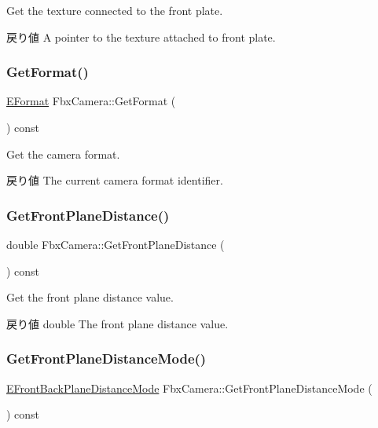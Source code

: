 Get the texture connected to the front plate. \begin{DoxyReturn}{戻り値}
A pointer to the texture attached to front plate. 
\end{DoxyReturn}
\mbox{\label{class_fbx_camera_a068be46bd59bcaa398565fcff992d18f}} 
\subsubsection{\texorpdfstring{Get\+Format()}{GetFormat()}}
{\footnotesize\ttfamily \hyperlink{class_fbx_camera_a88d68c983d21e4d6c0f281a8a30f0a06}{E\+Format} Fbx\+Camera\+::\+Get\+Format (\begin{DoxyParamCaption}{ }\end{DoxyParamCaption}) const}

Get the camera format. \begin{DoxyReturn}{戻り値}
The current camera format identifier. 
\end{DoxyReturn}
\mbox{\label{class_fbx_camera_a3097c7c0e8a3ce8e809c248d9d8be18b}} 
\subsubsection{\texorpdfstring{Get\+Front\+Plane\+Distance()}{GetFrontPlaneDistance()}}
{\footnotesize\ttfamily double Fbx\+Camera\+::\+Get\+Front\+Plane\+Distance (\begin{DoxyParamCaption}{ }\end{DoxyParamCaption}) const}

Get the front plane distance value. \begin{DoxyReturn}{戻り値}
double The front plane distance value. 
\end{DoxyReturn}
\mbox{\label{class_fbx_camera_a2923892fe43a8d86e9a2902d94672dfe}} 
\subsubsection{\texorpdfstring{Get\+Front\+Plane\+Distance\+Mode()}{GetFrontPlaneDistanceMode()}}
{\footnotesize\ttfamily \hyperlink{class_fbx_camera_a79e74898d117e741c3fbd10b1ef21c79}{E\+Front\+Back\+Plane\+Distance\+Mode} Fbx\+Camera\+::\+Get\+Front\+Plane\+Distance\+Mode (\begin{DoxyParamCaption}{ }\end{DoxyParamCaption}) const}

